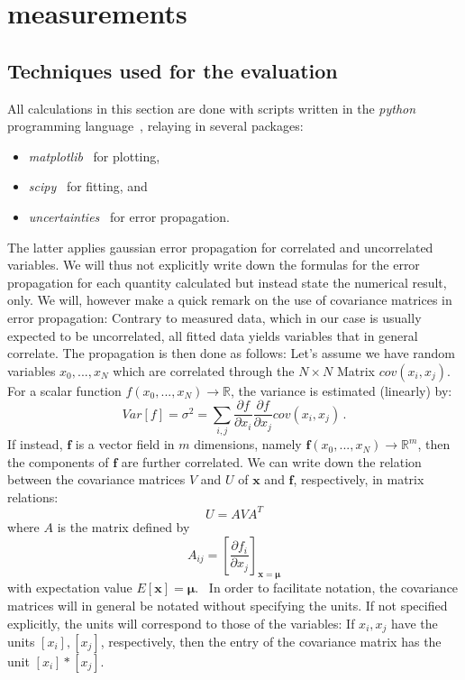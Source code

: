 \section{measurements}
\subsection{Techniques used for the evaluation}
All calculations in this section are done with scripts written in 
the \textit{python} programming language~\cite{python}, relaying in several 
packages:
\begin{itemize}
    \item
        \textit{matplotlib}~\cite{Hunter2007} for plotting,
    \item
        \textit{scipy}~\cite{scipy} for fitting, and 
    \item
        \textit{uncertainties}~\cite{uc} for error propagation.
\end{itemize}
The latter applies gaussian error propagation for correlated and uncorrelated variables. 
We will thus not explicitly write down the formulas for the error propagation 
for each quantity calculated but instead state the numerical result, only. 
We will, however make a quick remark on the use of covariance matrices in 
error propagation: Contrary to measured data, which in our case is usually 
expected to be uncorrelated, all fitted data yields variables that in general correlate. 
The propagation is then done as follows:
Let's assume we have random
variables $x_0,...,x_N$ which are correlated through the $N\times N$ Matrix $cov(x_i,x_j)$.
For a scalar function $f(x_0,...,x_N) \rightarrow \mathbb{R}$, the variance is estimated (linearly) by:
\begin{equation}
Var[f] = \sigma^2 = \sum_{i,j} \frac{\partial f}{\partial x_i} \frac{\partial f}{\partial x_j} cov(x_i,x_j) \,.
\end{equation} 
If instead, $\mathbf{f}$ is a vector field in $m$ dimensions, namely 
$\mathbf{f}(x_0,...,x_N) \rightarrow \mathbb{R}^m$, then the components of $\mathbf{f}$ 
are further correlated. We can write down the relation between the covariance matrices $V$ and $U$ of 
$\mathbf{x}$ and $\mathbf{f}$, respectively, in matrix relations:
\begin{equation}
    U = A V A^T
\end{equation}
where $A$ is the matrix defined by 
\begin{equation}
    A_{ij} = \left[ \frac{\partial f_i}{\partial x_j}\right]_{\mathbf{x} = \mathbf{\mu}}
\end{equation}
with expectation value $E[\mathbf{x}] = \mathbf{\mu}$.~\cite{cowan1998statistical}
In order to facilitate notation, the covariance matrices will in general be notated without 
specifying the units. If not specified explicitly, the units will correspond to those of the
variables: If $x_i, x_j$ have the units $[x_i], [x_j]$, respectively, 
then the entry of the covariance matrix has the unit $[x_i] * [x_j]$. 


